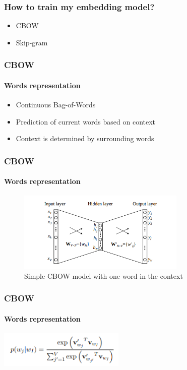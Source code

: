 
\begin{frame}
\frametitle{How to train my embedding model?}
	
	\begin{itemize}
		\item CBOW
		\item Skip-gram
	\end{itemize}

\end{frame}

\begin{frame}
\frametitle{CBOW}
	\framesubtitle{Words representation}

	\begin{itemize}
		\item Continuous Bag-of-Words
		\item Prediction of current words based on context
		\item Context is determined by surrounding words
	\end{itemize}

\end{frame}

\begin{frame}
\frametitle{CBOW}
	\framesubtitle{Words representation}

	\begin{figure}
		\includegraphics[width=8cm]{./figures/cbow_simple}
		\caption{Simple CBOW model with one word in the context}
	\end{figure}

\end{frame}


\begin{frame}
\frametitle{CBOW}
	\framesubtitle{Words representation}

	\begin{center}
		\includegraphics[width=6cm]{./figures/cbow_eq}
	\end{center}

\end{frame}


